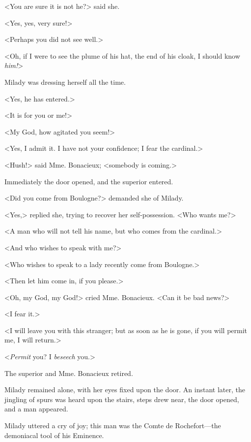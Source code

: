 <You are sure it is not he?> said she. 

<Yes, yes, very sure!> 

<Perhaps you did not see well.> 

<Oh, if I were to see the plume of his hat, the end of his cloak, I should know \textit{him!}> 

Milady was dressing herself all the time. 

<Yes, he has entered.> 

<It is for you or me!> 

<My God, how agitated you seem!> 

<Yes, I admit it. I have not your confidence; I fear the cardinal.> 

<Hush!> said Mme. Bonacieux; <somebody is coming.> 

Immediately the door opened, and the superior entered. 

<Did you come from Boulogne?> demanded she of Milady. 

<Yes,> replied she, trying to recover her self-possession. <Who wants me?> 

<A man who will not tell his name, but who comes from the cardinal.> 

<And who wishes to speak with me?> 

<Who wishes to speak to a lady recently come from Boulogne.> 

<Then let him come in, if you please.> 

<Oh, my God, my God!> cried Mme. Bonacieux. <Can it be bad news?> 

<I fear it.> 

<I will leave you with this stranger; but as soon as he is gone, if you will permit me, I will return.> 

<\textit{Permit} you? I \textit{beseech} you.> 

The superior and Mme. Bonacieux retired. 

Milady remained alone, with her eyes fixed upon the door. An instant later, the jingling of spurs was heard upon the stairs, steps drew near, the door opened, and a man appeared. 

Milady uttered a cry of joy; this man was the Comte de Rochefort---the demoniacal tool of his Eminence. 